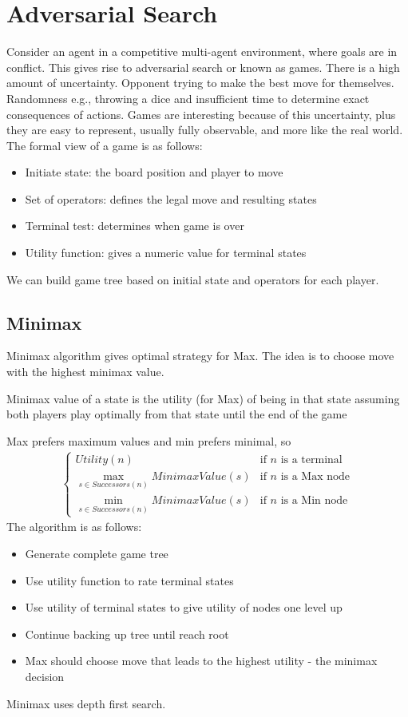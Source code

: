 \documentclass[a4paper]{article}
\theoremstyle{plain}
\theoremstyle{definition}
\newtheorem{defn}{Definition}[section]
\theoremstyle{remark}
\begin{document}
\section{Adversarial Search}
Consider an agent in a competitive multi-agent environment, where goals are in conflict. This gives rise to adversarial search or known as games. There is a high amount of uncertainty. Opponent trying to make the best move for themselves. Randomness e.g., throwing a dice and insufficient time to determine exact consequences of actions. Games are interesting because of this uncertainty, plus they are easy to represent, usually fully observable, and more like the real world. \\
The formal view of a game is as follows:
\begin{itemize}
	\item Initiate state: the board position and player to move
	\item Set of operators: defines the legal move and resulting states
	\item Terminal test: determines when game is over
	\item Utility function: gives a numeric value for terminal states
\end{itemize}
We can build game tree based on initial state and operators for each player. 
\subsection{Minimax}
Minimax algorithm gives optimal strategy for Max. The idea is to choose move with the highest minimax value.
\begin{tcolorbox}[colback=black!3!white,colframe=black!60!white,title=\begin{defn}Minimax Value \label{Minimax Value}\end{defn}]
Minimax value of a state is the utility (for Max) of being in that state assuming both players play optimally from that state until the end of the game
\end{tcolorbox}
Max prefers maximum values and min prefers minimal, so
\begin{align*}
	\begin{cases}
		Utility(n) & \text{if $n$ is a terminal}\\
		\max_{s \in Successors(n)} MinimaxValue(s) & \text{if $n$ is a Max node}\\
		\min_{s\in Successors(n)} MinimaxValue(s)  & \text{if $n$ is a Min node}
	\end{cases}
\end{align*}
The algorithm is as follows:
\begin{itemize}
	\item Generate complete game tree
	\item Use utility function to rate terminal states
	\item Use utility of terminal states to give utility of nodes one level up
	\item Continue backing up tree until reach root
	\item Max should choose move that leads to the highest utility - the minimax decision
\end{itemize}
Minimax uses depth first search.
\end{document}
